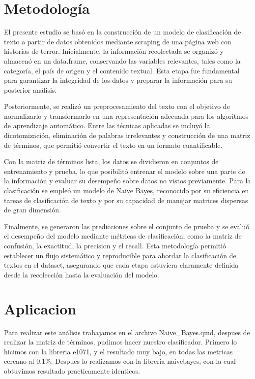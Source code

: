 \documentclass[
  11pt,
  a4paper,
]{article}
\begin{document}
\section{Metodología}\label{metodologuxeda}

El presente estudio se basó en la construcción de un modelo de
clasificación de texto a partir de datos obtenidos mediante scraping de
una página web con historias de terror. Inicialmente, la información
recolectada se organizó y almacenó en un data.frame, conservando las
variables relevantes, tales como la categoría, el país de origen y el
contenido textual. Esta etapa fue fundamental para garantizar la
integridad de los datos y preparar la información para su posterior
análisis.

Posteriormente, se realizó un preprocesamiento del texto con el objetivo
de normalizarlo y transformarlo en una representación adecuada para los
algoritmos de aprendizaje automático. Entre las técnicas aplicadas se
incluyó la dicotomización, eliminación de palabras irrelevantes y
construcción de una matriz de términos, que permitió convertir el texto
en un formato cuantificable.

Con la matriz de términos lista, los datos se dividieron en conjuntos de
entrenamiento y prueba, lo que posibilitó entrenar el modelo sobre una
parte de la información y evaluar su desempeño sobre datos no vistos
previamente. Para la clasificación se empleó un modelo de Naive Bayes,
reconocido por su eficiencia en tareas de clasificación de texto y por
su capacidad de manejar matrices dispersas de gran dimensión.

Finalmente, se generaron las predicciones sobre el conjunto de prueba y
se evaluó el desempeño del modelo mediante métricas de clasificación,
como la matriz de confusión, la exactitud, la precision y el recall.
Esta metodología permitió establecer un flujo sistemático y reproducible
para abordar la clasificación de textos en el dataset, asegurando que
cada etapa estuviera claramente definida desde la recolección hasta la
evaluación del modelo.

\section{Aplicacion}\label{aplicacion}

Para realizar este análisis trabajamos en el archivo Naive\_Bayes.qmd,
despues de realizar la matriz de términos, pudimos hacer nuestro
clasificador. Primero lo hicimos con la libreria e1071, y el resultado
muy bajo, en todas las metricas cercano al 0.1\%. Despues lo realizamos
con la libreria naivebayes, con la cual obtuvimos resultado
practicamente identicos.
\end{document}
